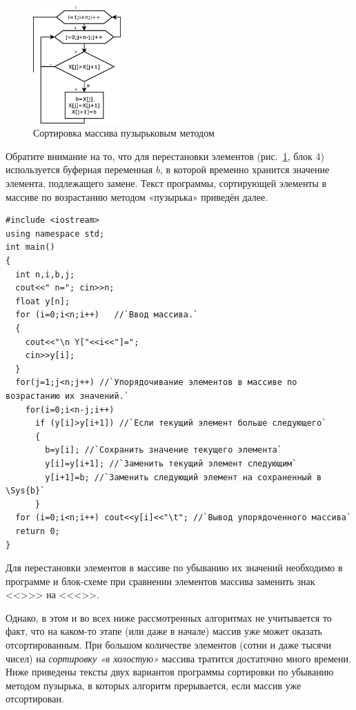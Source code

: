\begin{figure}[htb]
\begin{center}
\includegraphics[width=0.3\textwidth]{img/ris_5_12}
\caption{Сортировка массива пузырьковым методом}
\label{ch05:refDrawing11}
\end{center}
\end{figure}

Обратите внимание на то, что для перестановки элементов (рис.~\ref{ch05:refDrawing11}, блок 4) используется буферная
переменная $b$, в которой временно хранится значение элемента, подлежащего замене. Текст программы, сортирующей элементы
в массиве по возрастанию методом «пузырька» приведён далее.
\begin{lstlisting}
#include <iostream>
using namespace std;
int main()
{
  int n,i,b,j;
  cout<<" n="; cin>>n;
  float y[n];
  for (i=0;i<n;i++)   //`Ввод массива.`
  {
    cout<<"\n Y["<<i<<"]=";
    cin>>y[i];
  }
  for(j=1;j<n;j++) //`Упорядочивание элементов в массиве по возрастанию их значений.`
    for(i=0;i<n-j;i++)
      if (y[i]>y[i+1]) //`Если текущий элемент больше следующего`
      {
        b=y[i]; //`Сохранить значение текущего элемента`
        y[i]=y[i+1]; //`Заменить текущий элемент следующим`
        y[i+1]=b; //`Заменить следующий элемент на сохраненный в \Sys{b}`
      }
  for (i=0;i<n;i++) cout<<y[i]<<"\t"; //`Вывод упорядоченного массива`
  return 0;
}
\end{lstlisting}

Для перестановки элементов в массиве по убыванию их значений необходимо в программе и блок-схеме при сравнении элементов
массива заменить знак <<{>}>> на <<{<}>>.

Однако, в этом и во всех ниже рассмотренных алгоритмах не учитывается то факт, что на каком-то этапе (или даже в начале)
массив уже может оказать отсортированным. При большом количестве элементов (сотни и даже тысячи чисел) на
\emph{сортировку «в холостую»} массива тратится достаточно много времени. Ниже приведены тексты двух
вариантов программы сортировки по убыванию методом пузырька, в которых алгоритм прерывается, если массив уже
отсортирован.

